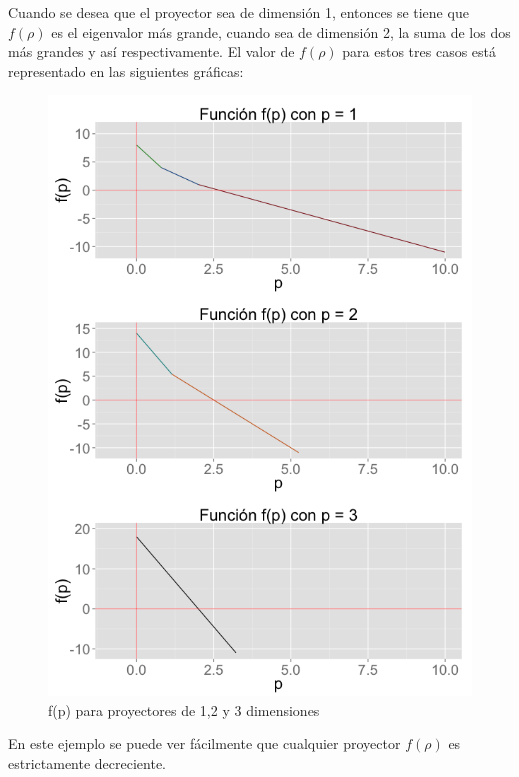 \begin{example}
Cuando se desea que el proyector sea de dimensión 1, entonces se tiene que $f(\rho)$ es el eigenvalor más grande,  cuando sea de dimensión 2, la suma de los dos más grandes y así respectivamente. El valor de $f(\rho)$ para estos tres casos está representado en las siguientes gráficas:

\pagebreak

\begin{figure}[!ht]
  \centering
  \includegraphics[width=1\textwidth]{Figures/Chapter2_grid3eigen}  
  \caption{f(p) para proyectores de 1,2 y 3 dimensiones}
\end{figure}

\pagebreak


\end{example}

En este ejemplo se puede ver fácilmente que cualquier proyector $f(\rho)$ es estrictamente decreciente.






